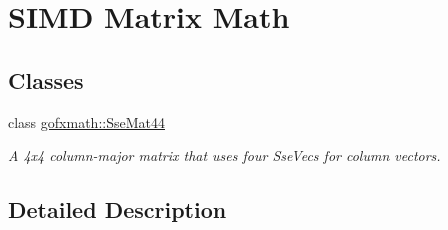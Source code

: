 \hypertarget{group___s_i_m_d_mat_math}{}\section{S\+I\+M\+D Matrix Math}
\label{group___s_i_m_d_mat_math}
\subsection*{Classes}
\begin{DoxyCompactItemize}
\item 
class \hyperlink{classgofxmath_1_1_sse_mat44}{gofxmath\+::\+Sse\+Mat44}
\begin{DoxyCompactList}\small\item\em A 4x4 column-\/major matrix that uses four Sse\+Vecs for column vectors. \end{DoxyCompactList}\end{DoxyCompactItemize}


\subsection{Detailed Description}
